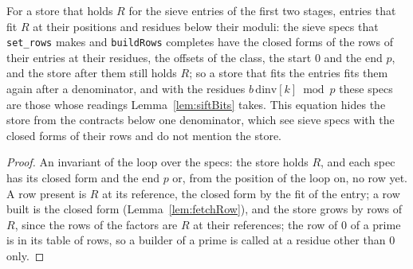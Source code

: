 \begin{lemma}\label{lem:buildRows}
  \leanok
  For a store that holds $R$ for the sieve entries of the first two stages, entries that fit $R$ at
  their positions and residues below their moduli: the sieve specs that \verb|set_rows| makes and
  \verb|buildRows| completes have the closed forms of the rows of their entries at their residues,
  the offsets of the class, the start $0$ and the end $p$, and the store after them still holds $R$;
  so a store that fits the entries fits them again after a denominator, and with the residues
  $b\,\mathrm{dinv}[k] \bmod p$ these specs are those whose readings Lemma~\ref{lem:siftBits} takes.
  This equation hides the store from the contracts below one denominator, which see sieve specs with
  the closed forms of their rows and do not mention the store.
\end{lemma}

\begin{proof}
  \leanok
  An invariant of the loop over the specs: the store holds $R$, and each spec has its closed form
  and the end $p$ or, from the position of the loop on, no row yet. A row present is $R$ at its
  reference, the closed form by the fit of the entry; a row built is the closed form
  (Lemma~\ref{lem:fetchRow}), and the store grows by rows of $R$, since the rows of the factors are
  $R$ at their references; the row of $0$ of a prime is in its table of rows, so a builder of a
  prime is called at a residue other than $0$ only.
\end{proof}

